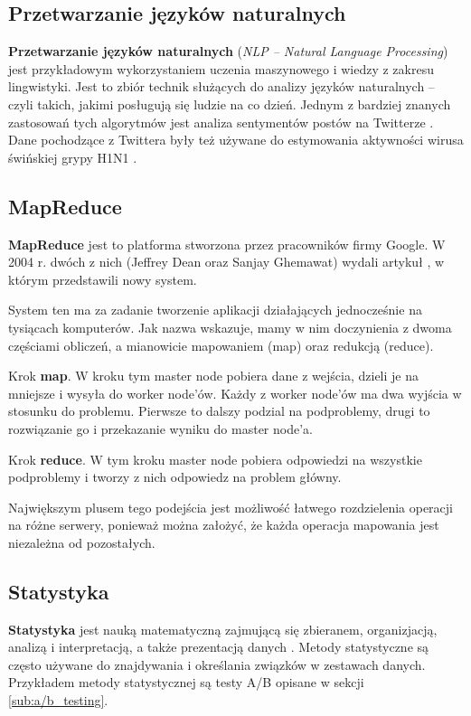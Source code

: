 \documentclass[10pt,twocolumn]{llncs}          %
\begin{document}
\subsection{Przetwarzanie języków naturalnych}
\label{sub:nlp}
\textbf{Przetwarzanie języków naturalnych} (\textit{NLP -- Natural Language Processing}) jest przykładowym wykorzystaniem uczenia maszynowego i wiedzy z zakresu lingwistyki. Jest to zbiór technik służących do analizy języków naturalnych -- czyli takich, jakimi posługują się ludzie na co dzień. Jednym z bardziej znanych zastosowań tych algorytmów jest analiza sentymentów postów na Twitterze \cite{agarwal11}. Dane pochodzące z Twittera były też używane do estymowania aktywności wirusa świńskiej grypy H1N1 \cite{signorini11}.

\subsection{MapReduce}
\label{sub:mapreduce}
\textbf{MapReduce} jest to platforma stworzona przez pracowników firmy Google.  W 2004 r. dwóch z nich (Jeffrey Dean oraz Sanjay Ghemawat) wydali artykuł \cite{dean08}, w którym przedstawili nowy system. 

System ten ma za zadanie tworzenie aplikacji działających jednocześnie na tysiącach komputerów. Jak nazwa wskazuje, mamy w nim doczynienia z dwoma częściami obliczeń, a mianowicie mapowaniem (map) oraz redukcją (reduce).

Krok \textbf{map}. W kroku tym master node pobiera dane z wejścia, dzieli je na mniejsze i wysyła do worker node'ów. Każdy z worker node'ów ma dwa wyjścia w stosunku do problemu. Pierwsze to dalszy podzial na podproblemy, drugi to rozwiązanie go i przekazanie wyniku do master node'a.

Krok \textbf{reduce}. W tym kroku master node pobiera odpowiedzi na wszystkie podproblemy i tworzy z nich odpowiedz na problem główny. 

Największym plusem tego podejścia jest możliwość łatwego rozdzielenia operacji na różne serwery, ponieważ można założyć, że każda operacja mapowania jest niezależna od pozostałych.

\subsection{Statystyka}
\label{sub:statystyka}
\textbf{Statystyka} jest nauką matematyczną zajmującą się zbieranem, organizjacją, analizą i interpretacją, a także prezentacją danych \cite{statystyka:podrecznik}. Metody statystyczne są często używane do znajdywania i określania związków w zestawach danych. Przykładem metody statystycznej są testy A/B opisane w sekcji \ref{sub:a/b_testing}.
\end{document}
